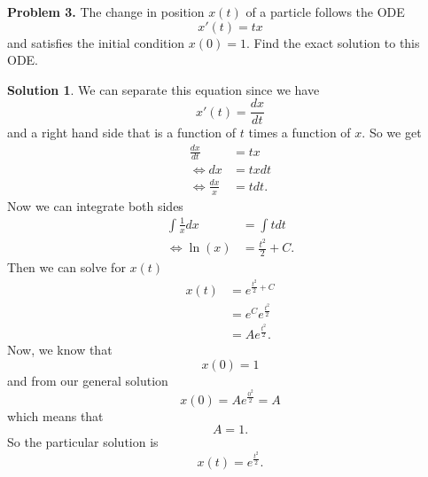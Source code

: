 \documentclass[12pt]{report} %
\theoremstyle{definition}
\newtheorem{solution}{Solution}
\begin{document}
\noindent\textbf{Problem 3.} The change in position $x(t)$ of a particle follows the ODE
\[
x'(t)=tx
\]
and satisfies the initial condition $x(0)=1$.  Find the exact solution to this ODE.
\begin{solution}
We can separate this equation since we have
\[
x'(t)=\frac{dx}{dt}
\]
and a right hand side that is a function of $t$ times a function of $x$. So we get
\begin{align*}
    \frac{dx}{dt} &= tx\\
    \iff dx &= txdt\\
    \iff \frac{dx}{x}&=tdt.
\end{align*}
Now we can integrate both sides
\begin{align*}
    \int \frac{1}{x}dx &= \int tdt\\
    \iff \ln(x)&=\frac{t^2}{2} + C.
\end{align*}
Then we can solve for $x(t)$
\begin{align*}
    x(t)&= e^{\frac{t^2}{2}+C}\\
    &= e^Ce^{\frac{t^2}{2}}\\
    &= Ae^{\frac{t^2}{2}}.
\end{align*}
Now, we know that
\[
x(0)=1
\]
and from our general solution
\[
x(0) = Ae^{\frac{0^2}{2}}=A
\]
which means that
\[
A=1.
\]
So the particular solution is
\[
x(t)=e^{\frac{t^2}{2}}.
\]
\end{solution}
\vspace*{.5cm}
\end{document}
